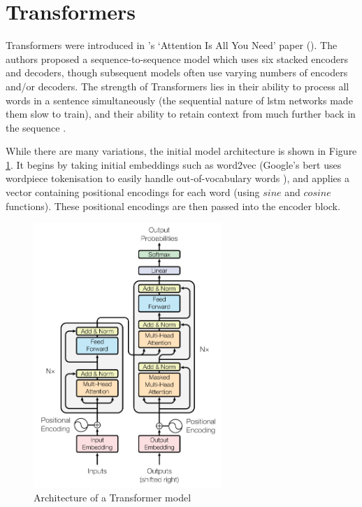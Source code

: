 

\section{Transformers}\label{sec:background_transformers}
Transformers were introduced in \citeauthor{vaswani2017attention}'s `Attention Is All You Need' paper (\citeyear{vaswani2017attention}). The authors proposed a sequence-to-sequence model which uses six stacked encoders and decoders, though subsequent models often use varying numbers of encoders and/or decoders. The strength of Transformers lies in their ability to process all words in a sentence simultaneously (the sequential nature of \acrshort{lstm} networks made them slow to train), and their ability to retain context from much further back in the sequence \citep{vaswani2017attention}.

While there are many variations, the initial model architecture is shown in Figure \ref{fig:transformer_architecture}. It begins by taking initial embeddings such as word2vec (Google's \acrshort{bert} uses wordpiece tokenisation to easily handle out-of-vocabulary words \citep{wu2016googles}), and applies a vector containing positional encodings for each word (using $sine$ and $cosine$ functions). These positional encodings are then passed into the encoder block.

\begin{figure}[h]
    \centering
    \includegraphics[height=10cm,trim={0 0 0cm 0cm},clip]{paper/images/transformer.png}
    \caption{Architecture of a Transformer model \citep{vaswani2017attention}}
    \label{fig:transformer_architecture}
\end{figure}


